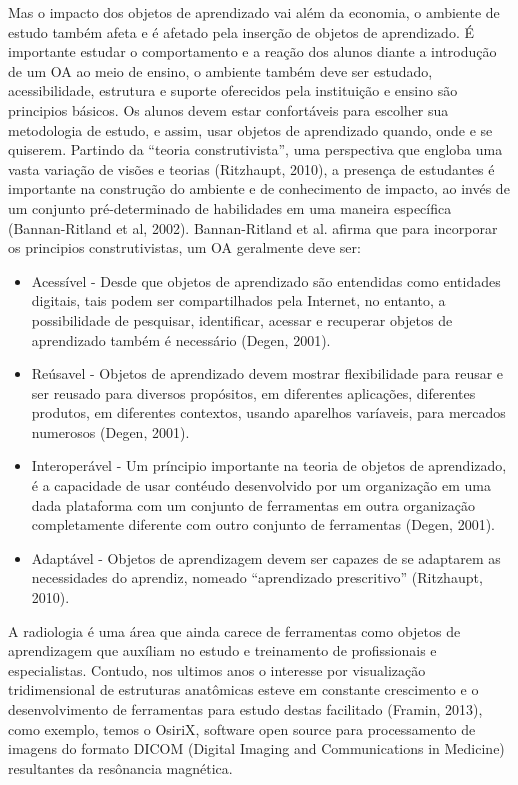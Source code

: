 \documentclass[12pt,openright,oneside,a4paper,english,french,spanish,brazil]{unifil}
\begin{document}
Mas o impacto dos objetos de aprendizado vai além da economia, o ambiente de estudo também afeta e é afetado pela inserção de objetos de aprendizado. É importante estudar o comportamento e a reação dos alunos diante a introdução de um OA ao meio de ensino, o ambiente também deve ser estudado, acessibilidade, estrutura e suporte oferecidos pela instituição e ensino são principios básicos. Os  alunos devem estar confortáveis para escolher sua metodologia de estudo, e assim, usar objetos de aprendizado quando, onde e se quiserem. Partindo da ``teoria construtivista'', uma perspectiva que engloba uma vasta variação de visões e teorias (Ritzhaupt, 2010), a presença de estudantes é importante na construção do ambiente e de conhecimento de impacto, ao invés de um conjunto pré-determinado de habilidades em uma maneira específica (Bannan-Ritland et al, 2002). Bannan-Ritland et al. afirma que para incorporar os principios construtivistas, um OA geralmente deve ser:
\begin{itemize}
\item Acessível - Desde que objetos de aprendizado são entendidas como entidades digitais, tais podem ser compartilhados pela Internet, no entanto, a possibilidade de pesquisar, identificar, acessar e recuperar objetos de aprendizado também é necessário (Degen, 2001).
\item Reúsavel - Objetos de aprendizado devem mostrar flexibilidade para reusar e ser reusado para diversos propósitos, em diferentes aplicações, diferentes produtos, em diferentes contextos, usando aparelhos varíaveis, para mercados numerosos (Degen, 2001).
\item Interoperável - Um príncipio importante na teoria de objetos de aprendizado, é a capacidade de usar contéudo desenvolvido por um organização em uma dada plataforma com um conjunto de ferramentas em outra organização completamente diferente com outro conjunto de ferramentas (Degen, 2001).
\item Adaptável - Objetos de aprendizagem devem ser capazes de se adaptarem as necessidades do aprendiz, nomeado ``aprendizado prescritivo'' (Ritzhaupt, 2010).
\end{itemize}

A radiologia é uma área que ainda carece de ferramentas como objetos de aprendizagem que auxíliam no estudo e treinamento de profissionais e especialistas. Contudo, nos ultimos anos o interesse por visualização tridimensional de estruturas anatômicas esteve em constante crescimento e o desenvolvimento de ferramentas para estudo destas facilitado (Framin, 2013), como exemplo, temos o OsiriX, software open source para processamento de imagens do formato DICOM (Digital Imaging and Communications in Medicine) resultantes da resônancia magnética. 
\end{document}
